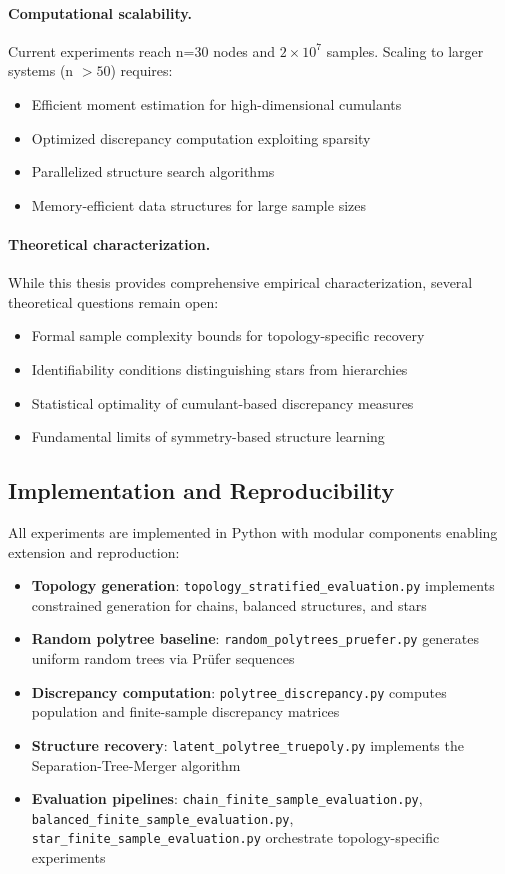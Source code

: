 \documentclass[11pt,a4paper]{article}
\numberwithin{equation}{section}
\begin{document}
\paragraph{Computational scalability.} Current experiments reach n=30 nodes and $2 \times 10^7$ samples. Scaling to larger systems (n $> 50$) requires:
\begin{itemize}
\item Efficient moment estimation for high-dimensional cumulants
\item Optimized discrepancy computation exploiting sparsity
\item Parallelized structure search algorithms
\item Memory-efficient data structures for large sample sizes
\end{itemize}

\paragraph{Theoretical characterization.} While this thesis provides comprehensive empirical characterization, several theoretical questions remain open:
\begin{itemize}
\item Formal sample complexity bounds for topology-specific recovery
\item Identifiability conditions distinguishing stars from hierarchies
\item Statistical optimality of cumulant-based discrepancy measures
\item Fundamental limits of symmetry-based structure learning
\end{itemize}

\subsection{Implementation and Reproducibility}

All experiments are implemented in Python with modular components enabling extension and reproduction:

\begin{itemize}
\item \textbf{Topology generation}: \texttt{topology\_stratified\_evaluation.py} implements constrained generation for chains, balanced structures, and stars
\item \textbf{Random polytree baseline}: \texttt{random\_polytrees\_pruefer.py} generates uniform random trees via Prüfer sequences
\item \textbf{Discrepancy computation}: \texttt{polytree\_discrepancy.py} computes population and finite-sample discrepancy matrices
\item \textbf{Structure recovery}: \texttt{latent\_polytree\_truepoly.py} implements the Separation-Tree-Merger algorithm
\item \textbf{Evaluation pipelines}: \texttt{chain\_finite\_sample\_evaluation.py}, \texttt{balanced\_finite\_sample\_evaluation.py}, \texttt{star\_finite\_sample\_evaluation.py} orchestrate topology-specific experiments
\end{itemize}
\end{document}
